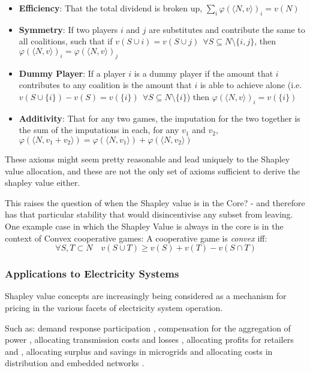 \begin{itemize}
\item	\textbf{Efficiency}: That the total dividend is broken up, $\sum_i\varphi(\langle N,v\rangle)_i = v(N)$
\item	\textbf{Symmetry}: If two players $i$ and $j$ are substitutes and contribute the same to all coalitions, such that if $v(S\cup i)=v(S\cup j)~~\forall S\subseteq N\setminus\{i,j\}$, then $\varphi(\langle N,v\rangle)_i = \varphi(\langle N,v\rangle)_j$
\item	\textbf{Dummy Player}: If a player $i$ is a dummy player if the amount that $i$ contributes to any coalition is the amount that $i$ is able to achieve alone (i.e.\ $v(S\cup \{i\})-v(S)=v(\{i\})~~\forall S\subseteq N\setminus\{i\}$) then $\varphi(\langle N,v\rangle)_i=v(\{i\})$
\item	\textbf{Additivity}: That for any two games, the imputation for the two together is the sum of the imputations in each, for any $v_1$ and $v_2$, $\varphi(\langle N,v_1+v_2\rangle)=\varphi(\langle N,v_1 \rangle) + \varphi(\langle N,v_2\rangle)$
\end{itemize}

These axioms might seem pretty reasonable and lead uniquely to the Shapley value allocation, and these are not the only set of axioms sufficient to derive the shapley value either.

This raises the question of when the Shapley value is in the Core? - and therefore has that particular stability that would disincentivise any subset from leaving.
One example case in which the Shapley Value is always in the core is in the context of Convex cooperative games:
A cooperative game is \textit{convex} iff:
\begin{equation}
    \forall S,T\subset N \quad v(S\cup T) \ge v(S)+v(T)-v(S\cap T)
\end{equation}

\subsubsection{Applications to Electricity Systems}

Shapley value concepts are increasingly being considered as a mechanism for pricing in the various facets of electricity system operation.

Such as: demand response participation \cite{DBLP:journals/tsg/OBrienGR15,electronics8010048,WANG201972}, compensation for the aggregation of power \cite{Perez-Diaz:2018:CEV:3237383.3237484,6520960}, allocating transmission costs and losses \cite{ip-gtd_20020005,SHARMA201733}, allocating profits for retailers and \cite{ACUNA2018161,WANG201972}, allocating surplus and savings in microgrids \cite{WU2017384} and allocating costs in distribution and embedded networks \cite{archie_paper1,8226810,10.1007/978-3-642-40776-5_19,6840296,DBLP:journals/corr/abs-1903-10965,AzuatalamCV_PowerTech2019}.


